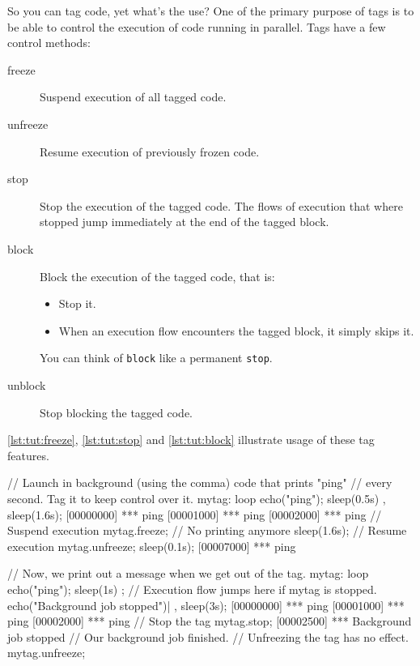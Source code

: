 So you can tag code, yet what's the use? One of the primary purpose of
tags is to be able to control the execution of code running in
parallel. Tags have a few control methods:

\begin{description}
\item[freeze] Suspend execution of all tagged code.
\item[unfreeze] Resume execution of previously frozen code.
\item[stop] Stop the execution of the tagged code. The flows of
  execution that where stopped jump immediately at the end of the
  tagged block.
\item[block] Block the execution of the tagged code, that is:
  \begin{itemize}
  \item Stop it.
  \item When an execution flow encounters the tagged block, it simply
    skips it.
  \end{itemize}
  You can think of \lstinline{block} like a permanent \lstinline{stop}.
\item[unblock] Stop blocking the tagged code.
\end{description}

\autoref{lst:tut:freeze}, \autoref{lst:tut:stop} and
\autoref{lst:tut:block} illustrate usage of these tag features.

\begin{urbiscript}[caption=Freezing/unfreezing code execution, label=lst:tut:freeze]
// Launch in background (using the comma) code that prints "ping"
// every second.  Tag it to keep control over it.
mytag:
{
  loop
  {
    echo("ping");
    sleep(0.5s)
  }
},
sleep(1.6s);
[00000000] *** ping
[00001000] *** ping
[00002000] *** ping
// Suspend execution
mytag.freeze;
// No printing anymore
sleep(1.6s);
// Resume execution
mytag.unfreeze;
sleep(0.1s);
[00007000] *** ping
\end{urbiscript}

\begin{urbiscript}[caption=Stopping code execution, label=lst:tut:stop]
// Now, we print out a message when we get out of the tag.
{
  mytag:
  {
    loop
    {
      echo("ping"); sleep(1s)
    }
  };
  // Execution flow jumps here if mytag is stopped.
  echo("Background job stopped")|
},
sleep(3s);
[00000000] *** ping
[00001000] *** ping
[00002000] *** ping
// Stop the tag
mytag.stop;
[00002500] *** Background job stopped
// Our background job finished.
// Unfreezing the tag has no effect.
mytag.unfreeze;
\end{urbiscript}


